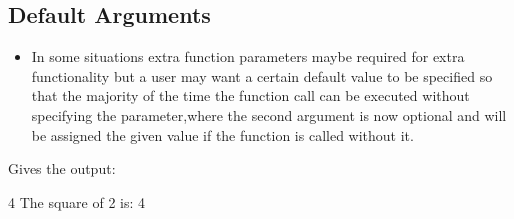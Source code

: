 \documentclass[letterpaper,10pt,english,openany]{sphinxmanual}
\begin{document}
\subsection{Default Arguments}
\label{\detokenize{introduction_to_python/working_with_functions:default-arguments}}\begin{itemize}
\item {} 
In some situations extra function parameters maybe required for extra
functionality but a user may want a certain default value to be
specified so that the majority of the time the function call can be
executed without specifying the parameter,where the second argument is
now optional and will be assigned the given value if the function is
called without it.

\end{itemize}

\begin{sphinxVerbatim}[commandchars=\\\{\}]
    

       
               
       

                               
     
\end{sphinxVerbatim}

Gives the output:

\begin{sphinxVerbatim}[commandchars=\\\{\}]
4
The square of 2 is: 4
\end{sphinxVerbatim}
\end{document}
